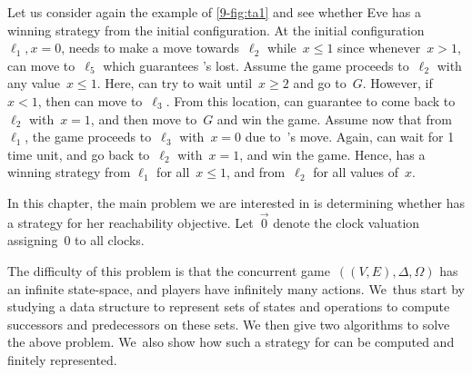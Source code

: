 \begin{example}
Let us consider again the example of \cref{9-fig:ta1} and see whether Eve
has a winning strategy from the initial configuration.
At the initial configuration~$\ell_1,x=0$, \Eve needs to make a move towards~$\ell_2$
while~$x\leq 1$ since whenever~$x>1$, \Adam can move to~$\ell_5$ which guarantees \Eve's lost.
Assume the game proceeds to~$\ell_2$ with any value~$x\leq 1$. Here, \Eve can try to wait
until~$x\geq 2$ and go to~$G$. However, if~$x<1$, then \Adam can move to~$\ell_3$.
From this location, \Eve can guarantee to come back to~$\ell_2$ with~$x=1$, and then move to~$G$ and win the game.
Assume now that from~$\ell_1$, the game proceeds to~$\ell_3$ with~$x=0$ due to~\Adam's move.
Again, \Eve can wait for 1 time unit, and go back to~$\ell_2$ with~$x=1$, and win the game.
%
Hence, \Eve has a winning strategy from $\ell_1$ for all~$x\leq 1$, and from~$\ell_2$
for all values of~$x$.
\end{example}


In this chapter, the main problem we are interested in is determining
whether \Eve has a strategy for her reachability objective.
Let~$\vec{0}$ denote the clock valuation assigning~$0$ to all clocks.


The difficulty of this problem is that the concurrent
game~$((V,E),\Delta,\Omega)$ has an infinite state-space, and players
have infinitely many actions.  We~thus start by studying a data
structure to represent sets of states and operations to compute
successors and predecessors on these sets.  We then give two
algorithms to solve the above problem.  We~also show how such a
strategy for \Eve can be computed and finitely represented.
